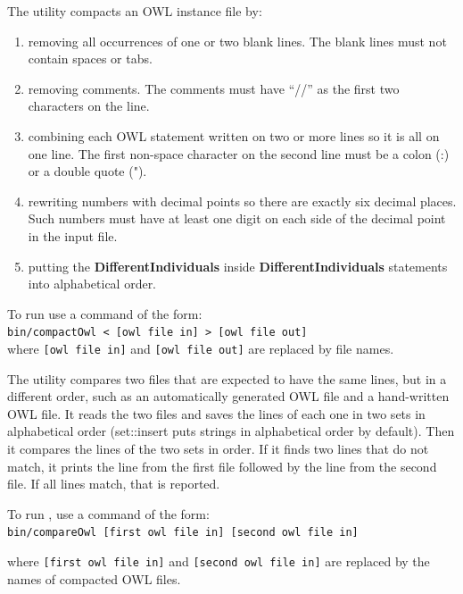 The  utility compacts an OWL instance file by:
\begin{enumerate}
\item removing all occurrences of one or two blank lines. The blank lines
   must not contain spaces or tabs.
\item removing comments. The comments must have ``//'' as the first two
   characters on the line.
\item combining each OWL statement written on two or more lines so it is
   all on one line. The first non-space character on the second line
   must be a colon (:) or a double quote (").
\item rewriting numbers with decimal points so there are exactly six decimal
   places. Such numbers must have at least one digit on each side of the
   decimal point in the input file.
\item putting the \textbf{DifferentIndividuals} inside \textbf{DifferentIndividuals} statements
   into alphabetical order.
\end{enumerate}
To run  use a command of the form:\\

\texttt{bin/compactOwl < [owl file in] > [owl file out]}\\

where \texttt{[owl file in]} and \texttt{[owl file out]} are replaced by file names.

The  utility compares two files that are expected to have the
same lines, but in a different order, such as an automatically generated
OWL file and a hand-written OWL file. It reads the two files and saves the
lines of each one in two sets in alphabetical order (set::insert puts
strings in alphabetical order by default). Then it compares the lines of
the two sets in order. If it finds two lines that do not match, it prints
the line from the first file followed by the line from the second file.  If
all lines match, that is reported.

To run , use a command of the form:\\

\texttt{bin/compareOwl [first owl file in] [second owl file in]}

where \texttt{[first owl file in]} and \texttt{[second owl file in]} are replaced by the
names of compacted OWL files.

